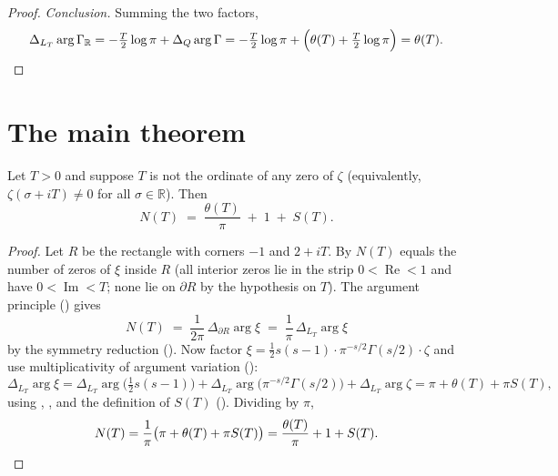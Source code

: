 \begin{proof}
\emph{Conclusion.} Summing the two factors,
\[
  \Delta_{L_T}\arg\Gamma_{\mathbb R}
   = -\tfrac{T}{2}\log\pi + \Delta_Q\arg\Gamma
   = -\tfrac{T}{2}\log\pi + \Bigl(\theta(T)+\tfrac{T}{2}\log\pi\Bigr)
   = \theta(T). \qedhere
\]
\end{proof}

\section{The main theorem}
\label{sec:nf_main}

\begin{theorem}
\label{thm:N_formula}
\leanok
{}
Let $T>0$ and suppose $T$ is not the ordinate of any zero of $\zeta$ (equivalently,
$\zeta(\sigma+iT)\neq0$ for all $\sigma\in\mathbb{R}$). Then
\[
  N(T) \;=\; \frac{\theta(T)}{\pi} \;+\; 1 \;+\; S(T).
\]
\end{theorem}

\begin{proof}
\leanok
{}
Let $R$ be the rectangle with corners $-1$ and $2+iT$. By 
$N(T)$ equals the number of zeros of $\xi$ inside $R$ (all interior zeros lie in the
strip $0<\operatorname{Re}<1$ and have $0<\operatorname{Im}<T$; none lie on
$\partial R$ by the hypothesis on $T$). The argument principle
() gives
\[
  N(T) \;=\; \frac{1}{2\pi}\,\Delta_{\partial R}\arg\xi
        \;=\; \frac{1}{\pi}\,\Delta_{L_T}\arg\xi
\]
by the symmetry reduction (). Now factor
$\xi=\tfrac12 s(s-1)\cdot\pi^{-s/2}\Gamma(s/2)\cdot\zeta$ and use multiplicativity of
argument variation ():
\[
  \Delta_{L_T}\arg\xi
  = \Delta_{L_T}\arg\bigl(\tfrac12 s(s-1)\bigr)
  + \Delta_{L_T}\arg\bigl(\pi^{-s/2}\Gamma(s/2)\bigr)
  + \Delta_{L_T}\arg\zeta
  = \pi + \theta(T) + \pi S(T),
\]
using , , and the definition of $S(T)$
(). Dividing by $\pi$,
\[
  N(T) = \frac{1}{\pi}\bigl(\pi + \theta(T) + \pi S(T)\bigr)
       = \frac{\theta(T)}{\pi} + 1 + S(T). \qedhere
\]
\end{proof}

